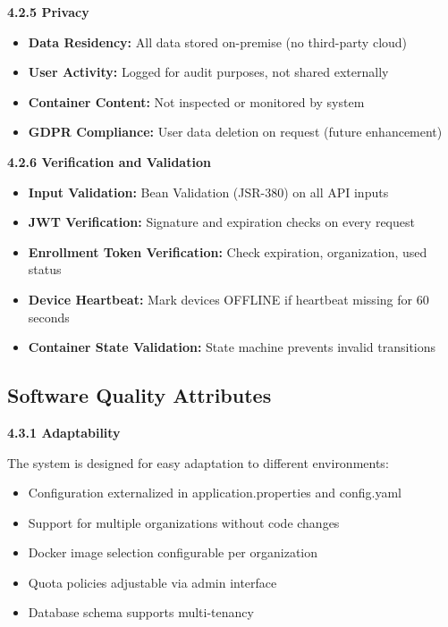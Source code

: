\documentclass[12pt,a4paper]{article}
\begin{document}
\textbf{4.2.5 Privacy}

\begin{itemize}[noitemsep]
    \item \textbf{Data Residency:} All data stored on-premise (no third-party cloud)
    \item \textbf{User Activity:} Logged for audit purposes, not shared externally
    \item \textbf{Container Content:} Not inspected or monitored by system
    \item \textbf{GDPR Compliance:} User data deletion on request (future enhancement)
\end{itemize}

\textbf{4.2.6 Verification and Validation}

\begin{itemize}[noitemsep]
    \item \textbf{Input Validation:} Bean Validation (JSR-380) on all API inputs
    \item \textbf{JWT Verification:} Signature and expiration checks on every request
    \item \textbf{Enrollment Token Verification:} Check expiration, organization, used status
    \item \textbf{Device Heartbeat:} Mark devices OFFLINE if heartbeat missing for 60 seconds
    \item \textbf{Container State Validation:} State machine prevents invalid transitions
\end{itemize}

\subsection{Software Quality Attributes}

\textbf{4.3.1 Adaptability}

The system is designed for easy adaptation to different environments:
\begin{itemize}[noitemsep]
    \item Configuration externalized in application.properties and config.yaml
    \item Support for multiple organizations without code changes
    \item Docker image selection configurable per organization
    \item Quota policies adjustable via admin interface
    \item Database schema supports multi-tenancy
\end{itemize}
\end{document}
